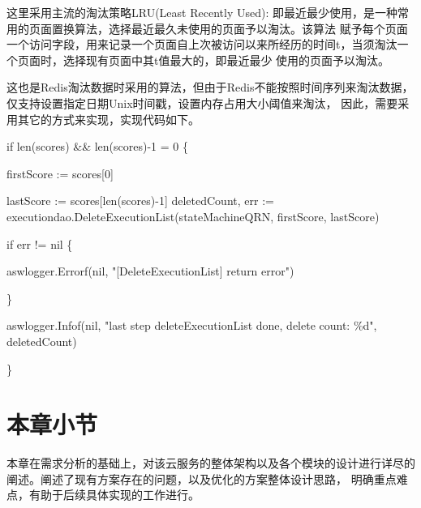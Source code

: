 这里采用主流的淘汰策略LRU(Least Recently Used): 即最近最少使用，是一种常用的页面置换算法，选择最近最久未使用的页面予以淘汰。该算法
赋予每个页面一个访问字段，用来记录一个页面自上次被访问以来所经历的时间t，当须淘汰一个页面时，选择现有页面中其t值最大的，即最近最少
使用的页面予以淘汰\cite{landman2021selfoptimizing}。

这也是Redis淘汰数据时采用的算法，但由于Redis不能按照时间序列来淘汰数据，仅支持设置指定日期Unix时间戳，设置内存占用大小阈值来淘汰，
因此，需要采用其它的方式来实现，实现代码如下。

\begin{algorithm}[H]
    \SetAlgoLined

    if len(scores)  \&\& len(scores)-1 \>= 0 \{

    firstScore := scores[0]

    lastScore := scores[len(scores)-1]
    deletedCount, err := executiondao.DeleteExecutionList(stateMachineQRN, firstScore, lastScore)

    if err != nil \{

    aswlogger.Errorf(nil, "[DeleteExecutionList] return error")

    \}

    aswlogger.Infof(nil, "last step deleteExecutionList done, delete count: \%d", deletedCount)

    \}
\end{algorithm}

\section{本章小节}
本章在需求分析的基础上，对该云服务的整体架构以及各个模块的设计进行详尽的阐述。阐述了现有方案存在的问题，以及优化的方案整体设计思路，
明确重点难点，有助于后续具体实现的工作进行。